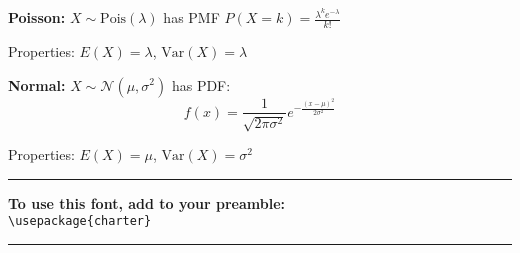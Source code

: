 \documentclass[10pt]{article}
\newcommand{\var}{\textrm{Var}}
\newcommand{\N}{\mathcal{N}}
\newcommand{\Pois}{\textrm{Pois}}
\begin{document}
\textbf{Poisson:} $X \sim \Pois(\lambda)$ has PMF $P(X = k) = \frac{\lambda^k e^{-\lambda}}{k!}$

Properties: $E(X) = \lambda$, $\var(X) = \lambda$

\textbf{Normal:} $X \sim \N(\mu, \sigma^2)$ has PDF:
\[f(x) = \frac{1}{\sqrt{2\pi\sigma^2}} e^{-\frac{(x-\mu)^2}{2\sigma^2}}\]

Properties: $E(X) = \mu$, $\var(X) = \sigma^2$

\vspace{1cm}
\begin{center}
\rule{\textwidth}{0.4pt}

\textbf{To use this font, add to your preamble:} \\
\verb|\usepackage{charter}|

\rule{\textwidth}{0.4pt}
\end{center}
\end{document}
